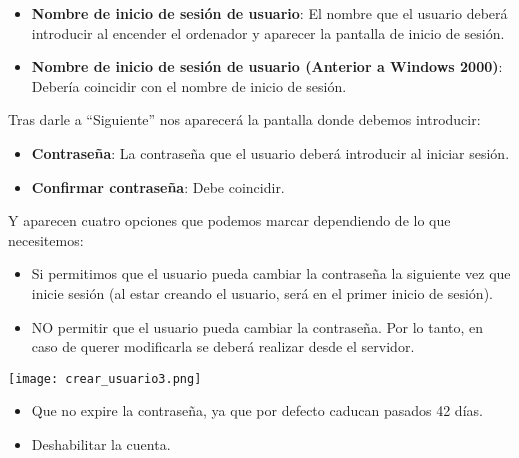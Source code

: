 \begin{itemize}
    \item \textbf{Nombre de inicio de sesión de usuario}: El nombre que el usuario deberá introducir al encender el ordenador y aparecer la pantalla de inicio de sesión.


    \item \textbf{Nombre de inicio de sesión de usuario (Anterior a Windows 2000)}: Debería coincidir con el nombre de inicio de sesión.
\end{itemize}

Tras darle a “Siguiente” nos aparecerá la pantalla donde debemos introducir:

\begin{itemize}
    \item \textbf{Contraseña}: La contraseña que el usuario deberá introducir al iniciar sesión.
    \item \textbf{Confirmar contraseña}: Debe coincidir.
\end{itemize}

Y aparecen cuatro opciones que podemos marcar dependiendo de lo que necesitemos:

{
    \begin{minipage}{0.65\linewidth}
        \begin{itemize}
            \item[\ding{111}] Si permitimos que el usuario pueda cambiar la contraseña la siguiente vez que inicie sesión (al estar creando el usuario, será en el primer inicio de sesión).
            \item[\ding{111}] NO permitir que el usuario pueda cambiar la contraseña. Por lo tanto, en caso de querer modificarla se deberá realizar desde el servidor.

        \end{itemize}
    \end{minipage}
    \hfill
    \begin{minipage}{0.3\linewidth}
        \texttt{[image: crear\_usuario3.png]}
    \end{minipage}
}

\begin{itemize}
    \item[\ding{111}] Que no expire la contraseña, ya que por defecto caducan pasados 42 días.
    \item[\ding{111}] Deshabilitar la cuenta.
\end{itemize}

